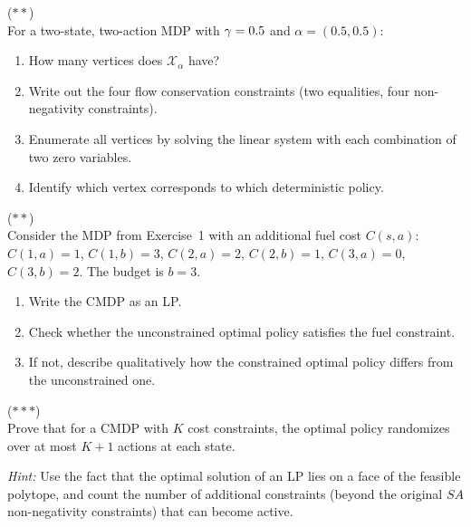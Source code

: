 \documentclass[11pt,a4paper]{article}
\begin{document}
\begin{exercise}
\textnormal{(\(**\))} \\
For a two-state, two-action MDP with $\gamma = 0.5$ and
$\alpha = (0.5, 0.5)$:
\begin{enumerate}[label=(\alph*)]
    \item How many vertices does $\mathcal{X}_\alpha$ have?
    \item Write out the four flow conservation constraints
    (two equalities, four non-negativity constraints).
    \item Enumerate all vertices by solving the linear system with
    each combination of two zero variables.
    \item Identify which vertex corresponds to which deterministic
    policy.
\end{enumerate}
\end{exercise}

\begin{exercise}
\textnormal{(\(**\))} \\
Consider the MDP from Exercise~1 with an additional fuel cost
$C(s,a)$: $C(1,a) = 1$, $C(1,b) = 3$, $C(2,a) = 2$,
$C(2,b) = 1$, $C(3,a) = 0$, $C(3,b) = 2$. The budget is
$b = 3$.
\begin{enumerate}[label=(\alph*)]
    \item Write the CMDP as an LP.
    \item Check whether the unconstrained optimal policy satisfies
    the fuel constraint.
    \item If not, describe qualitatively how the constrained
    optimal policy differs from the unconstrained one.
\end{enumerate}
\end{exercise}

\begin{exercise}
\textnormal{(\(***\))} \\
Prove that for a CMDP with $K$ cost constraints, the optimal policy
randomizes over at most $K + 1$ actions at each state.

\textit{Hint:} Use the fact that the optimal solution of an LP lies
on a face of the feasible polytope, and count the number of
additional constraints (beyond the original $SA$ non-negativity
constraints) that can become active.
\end{exercise}
\end{document}
